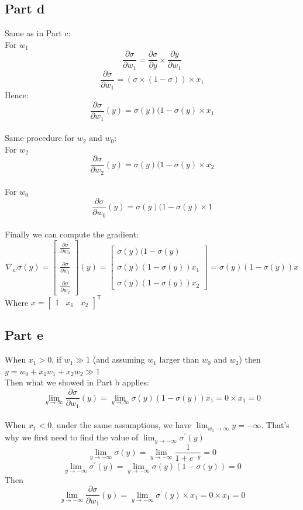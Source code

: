 \documentclass[a4paper, 10pt]{article}
\begin{document}
\subsection{Part d}
Same as in Part c:
\\
For $w_1$
$$
\frac{\partial\sigma}{\partial w_1} = \frac{\partial\sigma}{\partial y} \times \frac{\partial y}{\partial w_1}
$$
$$
\frac{\partial\sigma}{\partial w_1} = \left(\sigma \times (1 - \sigma)\right) \times x_1
$$
Hence:
$$
\frac{\partial\sigma}{\partial w_1}(y) = \sigma(y) (1-\sigma(y) \times x_1
$$
\\
Same procedure for $w_2$ and $w_0$:\\
For $w_2$
$$
\frac{\partial\sigma}{\partial w_2}(y) = \sigma(y) (1-\sigma(y) \times x_2
$$
\\
For $w_0$
$$
\frac{\partial\sigma}{\partial w_0}(y) = \sigma(y) (1-\sigma(y) \times 1
$$
\\
Finally we can compute the gradient:
$$
\nabla_w\sigma(y) = \begin{bmatrix}
                        \frac{\partial\sigma}{\partial w_0}\\\\
                        \frac{\partial\sigma}{\partial w_1}\\\\
                        \frac{\partial\sigma}{\partial w_2}
                    \end{bmatrix}(y) = 
                    \begin{bmatrix}
                        \sigma(y) (1-\sigma(y)\\\\
                        \sigma(y) (1-\sigma(y)) x_1\\\\
                        \sigma(y) (1-\sigma(y)) x_2
                    \end{bmatrix} =
                    \sigma(y)(1-\sigma(y))x
$$
Where $x =  \begin{bmatrix}
            1 & x_1 & x_2
            \end{bmatrix}^\mathsf{T}$

\subsection{Part e}
When $x_1 > 0$, if $w_1 \gg 1$ (and assuming $w_1$ larger than $w_0$ and $w_2$) then $y = w_0 + x_1w_1 + x_2w_2 \gg 1$
\\
Then what we showed in Part b applies:
$$
\lim_{y\to\infty} \frac{\partial\sigma}{\partial w_1}(y) = \lim_{y\to\infty} \sigma(y) (1-\sigma(y)) x_1 = 0 \times x_1 = 0
$$
\\
When $x_1 < 0$, under the same assumptions, we have $\lim_{w_1\to\infty}y = -\infty$. That's why we first need to find the value of $\lim_{y\to -\infty}\sigma^\prime(y)$
$$
\lim_{y\to -\infty}\sigma(y) = \lim_{y\to -\infty} \frac{1}{1+e^{-y}} = 0
$$
$$
\lim_{y\to -\infty}\sigma^\prime(y) = \lim_{y\to -\infty} \sigma(y)(1-\sigma(y))=0
$$
Then
$$
\lim_{y\to -\infty}\frac{\partial\sigma}{\partial w_1}(y) = \lim_{y\to -\infty} \sigma^\prime(y) \times x_1 = 0 \times x_1 = 0
$$
\end{document}
